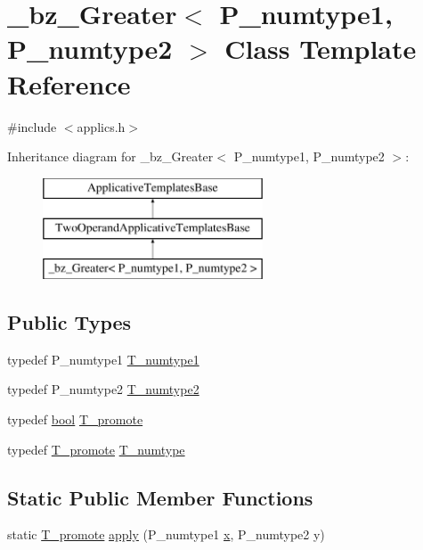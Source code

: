 \hypertarget{class__bz__Greater}{}\section{\+\_\+bz\+\_\+\+Greater$<$ P\+\_\+numtype1, P\+\_\+numtype2 $>$ Class Template Reference}
\label{class__bz__Greater}


{\ttfamily \#include $<$applics.\+h$>$}

Inheritance diagram for \+\_\+bz\+\_\+\+Greater$<$ P\+\_\+numtype1, P\+\_\+numtype2 $>$\+:\begin{figure}[H]
\begin{center}
\leavevmode
\includegraphics[height=3.000000cm]{class__bz__Greater}
\end{center}
\end{figure}
\subsection*{Public Types}
\begin{DoxyCompactItemize}
\item 
typedef P\+\_\+numtype1 \hyperlink{class__bz__Greater_a8ddeec6476cc619ba71eba079979b2dd}{T\+\_\+numtype1}
\item 
typedef P\+\_\+numtype2 \hyperlink{class__bz__Greater_a9c67f61cf53f43956b139ca9585f3ee8}{T\+\_\+numtype2}
\item 
typedef \hyperlink{compiler_8h_abb452686968e48b67397da5f97445f5b}{bool} \hyperlink{class__bz__Greater_a32899f8ff0733ed0194152237a3ad62f}{T\+\_\+promote}
\item 
typedef \hyperlink{class__bz__Greater_a32899f8ff0733ed0194152237a3ad62f}{T\+\_\+promote} \hyperlink{class__bz__Greater_a01f30906fb2e83c8eb87eeb6c6d79338}{T\+\_\+numtype}
\end{DoxyCompactItemize}
\subsection*{Static Public Member Functions}
\begin{DoxyCompactItemize}
\item 
static \hyperlink{class__bz__Greater_a32899f8ff0733ed0194152237a3ad62f}{T\+\_\+promote} \hyperlink{class__bz__Greater_afa37dce7b2ea274af4cdb6f067ce44a0}{apply} (P\+\_\+numtype1 \hyperlink{vecnorm1_8cc_ac73eed9e41ec09d58f112f06c2d6cb63}{x}, P\+\_\+numtype2 y)
\end{DoxyCompactItemize}


